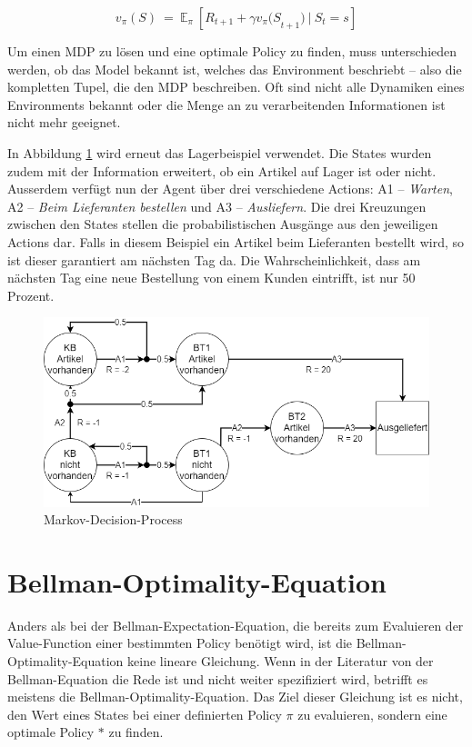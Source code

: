 \begin{equation}
v_\pi(S)\ ={\ \mathbb{E}}_\pi\ [R_{t+1}+{\gamma v_\pi(S}_{t+1})\ |{\ S}_t=s]
\end{equation}

Um einen MDP zu lösen und eine optimale Policy zu finden, muss unterschieden werden, ob das Model bekannt ist, welches das Environment beschriebt – also die kompletten Tupel, die den MDP beschreiben. Oft sind nicht alle Dynamiken eines Environments bekannt oder die Menge an zu verarbeitenden Informationen ist nicht mehr geeignet.

In Abbildung \ref{fig:mdp} wird erneut das Lagerbeispiel verwendet. Die States wurden zudem mit der Information erweitert, ob ein Artikel auf Lager ist oder nicht. Ausserdem verfügt nun der Agent über drei verschiedene Actions: A1 – \emph{Warten}, A2 – \emph{Beim Lieferanten bestellen} und A3 – \emph{Ausliefern}. Die drei Kreuzungen zwischen den States stellen die probabilistischen Ausgänge aus den jeweiligen Actions dar. Falls in diesem Beispiel ein Artikel beim Lieferanten bestellt wird, so ist dieser garantiert am nächsten Tag da. Die Wahrscheinlichkeit, dass am nächsten Tag eine neue Bestellung von einem Kunden eintrifft, ist nur 50 Prozent.

 \begin{figure}[h]
  \centering
  \includegraphics[width=\textwidth]{img/Markov_Decision_Prozess.png}
  \caption{Markov-Decision-Process}
  \label{fig:mdp}
\end{figure}




\section{Bellman-Optimality-Equation}
Anders als bei der Bellman-Expectation-Equation, die bereits zum Evaluieren der Value-Function einer bestimmten Policy benötigt wird, ist die Bellman-Optimality-Equation keine lineare Gleichung. Wenn in der Literatur von der Bellman-Equation die Rede ist und nicht weiter spezifiziert wird, betrifft es meistens die Bellman-Optimality-Equation. Das Ziel dieser Gleichung ist es nicht, den Wert eines States bei einer definierten Policy $\pi$ zu evaluieren, sondern eine optimale Policy $\ast$ zu finden. 

